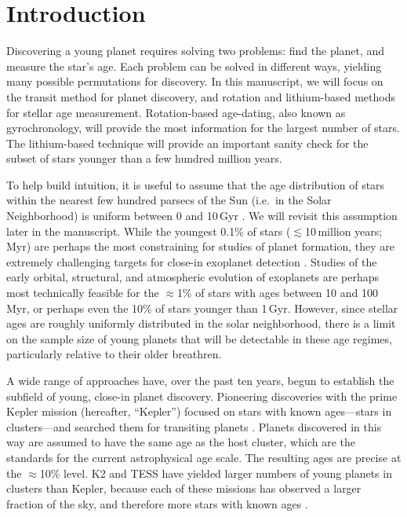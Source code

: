 \documentclass[11pt,twocolumn,tighten]{aastex63}
\begin{document}

\section{Introduction}
\label{sec:intro}

Discovering a young planet requires solving two problems: find the
planet, and measure the star's age.  Each problem can be
solved in different ways, yielding many possible permutations for
discovery.  In this manuscript, we will focus on the transit method
for planet discovery, and rotation and lithium-based methods for stellar age
measurement.  Rotation-based age-dating, also known as
gyrochronology, will provide the most information for the largest
number of stars.  The lithium-based technique will provide an
important sanity check for the subset of stars younger than a few
hundred million years.

To help build intuition, it is useful to assume that the age
distribution of stars within the nearest few hundred parsecs of the
Sun (i.e.~in the Solar Neighborhood) is uniform between 0 and 10\,Gyr
\citep{Nordstrom_2004}.  We will revisit this assumption later in the
manuscript.  While the youngest 0.1\% of stars ($\lesssim$10\,million
years; Myr) are perhaps the most constraining for studies of planet
formation, they are extremely challenging targets for close-in
exoplanet detection 
\citep[see e.g.][]{Damasso_2020,Bouma_2020_ptfo,Donati_2020}.  Studies of
the early orbital, structural, and atmospheric evolution of exoplanets
are perhaps most technically feasible for the $\approx$1\% of stars
with ages between 10 and 100\,Myr, or perhaps even the 10\% of stars
younger than 1\,Gyr.  However, since stellar ages are roughly
uniformly distributed in the solar neighborhood, there is a limit on
the sample size of young planets that will be detectable in these age
regimes, particularly relative to their older breathren.

A wide range of approaches have, over the past ten years, begun to
establish the subfield of young, close-in planet discovery.
Pioneering discoveries with the prime Kepler mission (hereafter,
``Kepler'') focused on stars with known ages---stars in clusters---and
searched them for transiting planets \citep{Meibom_2013}.  Planets
discovered in this way are assumed to have the same age as the host
cluster, which are the standards for the current astrophysical age
scale.  The resulting ages are precise at the $\approx$10\% level.  K2
and TESS have yielded larger numbers of young planets in clusters than
Kepler, because each of these missions has observed a larger fraction
of the sky, and therefore more stars with known ages
\citep[e.g.][]{Mann_K2_25_2016,Mann_2017,Curtis_2018,Livingston_2018,David_2019,Bouma_2020_toi837,Rizzuto_2020,Plavchan_2020,Newton_2021,Nardiello_2022,Tofflemire_2021,Zhou_2022,Zakhozhay_2022,Wood_2023}.
\end{document}
